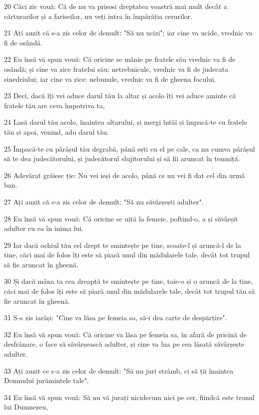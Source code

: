\par 20 Căci zic vouă: Că de nu va prisosi dreptatea voastră mai mult decât a cărturarilor și a fariseilor, nu veți intra în împărăția cerurilor.
\par 21 Ați auzit că s-a zis celor de demult: "Să nu ucizi"; iar cine va ucide, vrednic va fi de osândă.
\par 22 Eu însă vă spun vouă: Că oricine se mânie pe fratele său vrednic va fi de osândă; și cine va zice fratelui său: netrebnicule, vrednic va fi de judecata sinedriului; iar cine va zice: nebunule, vrednic va fi de gheena focului.
\par 23 Deci, dacă îți vei aduce darul tău la altar și acolo îți vei aduce aminte că fratele tău are ceva împotriva ta,
\par 24 Lasă darul tău acolo, înaintea altarului, și mergi întâi și împacă-te cu fratele tău și apoi, venind, adu darul tău.
\par 25 Împacă-te cu pârâșul tău degrabă, până ești cu el pe cale, ca nu cumva pârâșul să te dea judecătorului, și judecătorul slujitorului și să fii aruncat în temniță.
\par 26 Adevărat grăiesc ție: Nu vei ieși de acolo, până ce nu vei fi dat cel din urmă ban.
\par 27 Ați auzit că s-a zis celor de demult: "Să nu săvârșești adulter".
\par 28 Eu însă vă spun vouă: Că oricine se uită la femeie, poftind-o, a și săvârșit adulter cu ea în inima lui.
\par 29 Iar dacă ochiul tău cel drept te smintește pe tine, scoate-l și aruncă-l de la tine, căci mai de folos îți este să piară unul din mădularele tale, decât tot trupul să fie aruncat în gheenă.
\par 30 Și dacă mâna ta cea dreaptă te smintește pe tine, taie-o și o aruncă de la tine, căci mai de folos îți este să piară unul din mădularele tale, decât tot trupul tău să fie aruncat în gheenă.
\par 31 S-a zis iarăși: "Cine va lăsa pe femeia sa, să-i dea carte de despărțire".
\par 32 Eu însă vă spun vouă: Că oricine va lăsa pe femeia sa, în afară de pricină de desfrânare, o face să săvârșească adulter, și cine va lua pe cea lăsată săvârșește adulter.
\par 33 Ați auzit ce s-a zis celor de demult: "Să nu juri strâmb, ci să ții înaintea Domnului jurămintele tale".
\par 34 Eu însă vă spun vouă: Să nu vă jurați nicidecum nici pe cer, fiindcă este tronul lui Dumnezeu,
